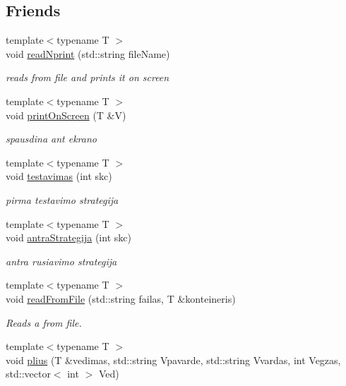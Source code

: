 \subsection*{Friends}
\begin{DoxyCompactItemize}
\item 
{\footnotesize template$<$typename T $>$ }\\void \mbox{\hyperlink{classnode_a1b7cc6b256e5658901d53cae3b0a2de0}{read\+Nprint}} (std\+::string file\+Name)
\begin{DoxyCompactList}\small\item\em reads from file and prints it on screen \end{DoxyCompactList}\item 
{\footnotesize template$<$typename T $>$ }\\void \mbox{\hyperlink{classnode_a185a0fca8047d41d3644ddc86d1e1840}{print\+On\+Screen}} (T \&V)
\begin{DoxyCompactList}\small\item\em spausdina ant ekrano \end{DoxyCompactList}\item 
{\footnotesize template$<$typename T $>$ }\\void \mbox{\hyperlink{classnode_aa50591c3dbb484a81afb0b7c912b7466}{testavimas}} (int skc)
\begin{DoxyCompactList}\small\item\em pirma testavimo strategija \end{DoxyCompactList}\item 
{\footnotesize template$<$typename T $>$ }\\void \mbox{\hyperlink{classnode_a097205487c0c52bf33282a17ae3e08cb}{antra\+Strategija}} (int skc)
\begin{DoxyCompactList}\small\item\em antra rusiavimo strategija \end{DoxyCompactList}\item 
{\footnotesize template$<$typename T $>$ }\\void \mbox{\hyperlink{classnode_a8226db4fb3563153b6fd59a1109e1e40}{read\+From\+File}} (std\+::string failas, T \&konteineris)
\begin{DoxyCompactList}\small\item\em Reads a from file. \end{DoxyCompactList}\item 
{\footnotesize template$<$typename T $>$ }\\void \mbox{\hyperlink{classnode_a7e23b4a662a606c67e6cbc8deae68dbd}{plius}} (T \&vedimas, std\+::string Vpavarde, std\+::string Vvardas, int Vegzas, std\+::vector$<$ int $>$ Ved)

\end{DoxyCompactItemize}
